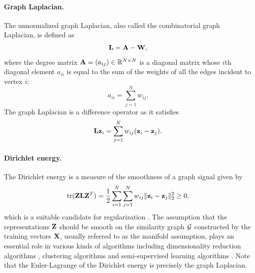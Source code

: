 \paragraph{Graph Laplacian.}
The unnormalized graph Laplacian, also called the combinatorial graph Laplacian, is defined as
\begin{equation}
	\mathbf{L} = \mathbf{A} - \mathbf{W},
\end{equation}
where the degree matrix $\mathbf{A}=(a_{ij}) \in \mathbb{R}^{N \times N}$ is a diagonal matrix whose $i$th diagonal element $a_{ii}$ is equal to the sum of the weights of all the edges incident to vertex $i$:
\begin{equation}
	a_{ii} = \sum\limits_{j=1}^{N} w_{ij}.
\end{equation}
The graph Laplacian is a difference operator as it satisfies
\begin{equation}
	\mathbf{L}\mathbf{z}_i = \sum\limits_{j=1}^{N} w_{ij} (\mathbf{z}_i - \mathbf{z}_j).
\end{equation}

\paragraph{Dirichlet energy.}
The Dirichlet energy is a measure of the smoothness of a graph signal given by
\begin{equation} \label{eqn:dirichlet_energy}
	\operatorname*{tr}(\mathbf{Z}\mathbf{L}\mathbf{Z}^T) = \frac{1}{2} \sum\limits_{i=1}^{N} \sum\limits_{j=1}^{N} w_{ij} \| \mathbf{z}_i - \mathbf{z}_j \|_2^2 \geq 0,
\end{equation}
which is a suitable candidate for regularization \cite{belkin2006manifoldRegularization}.
The assumption that the representations $\mathbf{Z}$ should be smooth on the similarity graph $\mathcal{G}$ constructed by the training vectors $\mathbf{X}$, usually referred to as the manifold assumption, plays an essential role in various kinds of algorithms including dimensionality reduction algorithms \cite{belkin2001laplacianEigenmaps}, clustering algorithms \cite{ng2002spectralClustering} and semi-supervised learning algorithms \cite{belkin2006manifoldRegularization, zhou2004manifoldRegularization}.
Note that the Euler-Lagrange of the Dirichlet energy is precisely the graph Laplacian.

